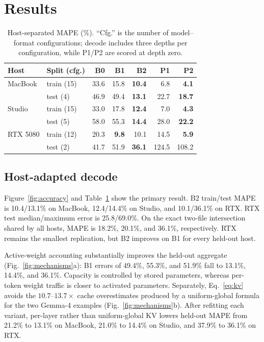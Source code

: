 \documentclass{article}
\begin{document}
\section{Results}
\label{sec:results}

\begin{table}[t]
\centering
\caption{Host-separated MAPE (\%).  ``Cfg.'' is the number of model--format
configurations; decode includes three depths per configuration, while P1/P2
are scored at depth zero.}
\label{tab:error}
\setlength{\tabcolsep}{3.0pt}
\begin{tabular}{@{}llrrrrr@{}}
\toprule
Host & Split (cfg.) & B0 & B1 & B2 & P1 & P2\\
\midrule
MacBook & train (15) & 33.6 & 15.8 & \textbf{10.4} & 6.8 & \textbf{4.1}\\
        & test (4)   & 46.9 & 49.4 & \textbf{13.1} & 22.7 & \textbf{18.7}\\
Studio & train (15) & 33.0 & 17.8 & \textbf{12.4} & 7.0 & \textbf{4.3}\\
       & test (5)   & 58.0 & 55.3 & \textbf{14.4} & 28.0 & \textbf{22.2}\\
RTX 5080 & train (12) & 20.3 & \textbf{9.8} & 10.1 & 14.5 & \textbf{5.9}\\
         & test (2)   & 41.7 & 51.9 & \textbf{36.1} & 124.5 & 108.2\\
\bottomrule
\end{tabular}
\end{table}

\subsection{Host-adapted decode}

Figure~\ref{fig:accuracy} and Table~\ref{tab:error} show the primary result.
B2 train/test MAPE is 10.4/13.1\% on MacBook, 12.4/14.4\% on Studio, and
10.1/36.1\% on RTX.  RTX test median/maximum error is 25.8/69.0\%.  On the exact
two-file intersection shared by all hosts, MAPE is 18.2\%, 20.1\%, and 36.1\%,
respectively.  RTX remains the smallest replication, but B2 improves on B1 for
every held-out host.

Active-weight accounting substantially improves the held-out aggregate
(Fig.~\ref{fig:mechanisms}a): B1 errors of 49.4\%, 55.3\%, and 51.9\% fall to
13.1\%, 14.4\%, and 36.1\%.  Capacity is controlled by stored parameters,
whereas per-token weight traffic is closer to activated parameters.  Separately,
Eq.~\eqref{eq:kv} avoids the
$10.7$--$13.7\times$ cache overestimates produced by a uniform-global formula
for the two Gemma-4 examples (Fig.~\ref{fig:mechanisms}b).  After refitting each
variant, per-layer rather than uniform-global KV lowers held-out MAPE from
21.2\% to 13.1\% on MacBook, 21.0\% to 14.4\% on Studio, and 37.9\% to 36.1\% on RTX.
\end{document}
